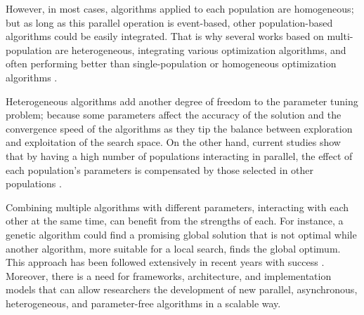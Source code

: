 \documentclass[review]{elsarticle}
\begin{document}
However, in most cases, algorithms applied to each population are 
homogeneous; but as long as this parallel operation is event-based, 
other population-based algorithms could be easily integrated.  That is why several
works based on multi-population are heterogeneous, integrating various
optimization algorithms, and often performing better than single-population or
homogeneous optimization algorithms \cite{wu2016differential,nseef2016adaptive}.

Heterogeneous algorithms add another degree of freedom to the parameter
tuning problem; because some parameters affect 
the accuracy of the solution and the convergence speed of the algorithms as they
tip the balance between exploration and exploitation of the search space. On the 
other hand, current studies show that by having a high number of populations 
interacting in parallel, the effect of each population's parameters is compensated 
by those selected in other populations \cite{li2016multi,tanabe2013evaluation}. %



Combining multiple algorithms with different parameters, interacting with each
other at the same time, can benefit from the strengths of each. For instance, a
genetic algorithm could find a promising global solution that is not optimal
while another algorithm, more suitable for a local search, finds the global
optimum. This approach has been followed extensively in recent years with
success \cite{li2015multi,godio2016multi,biswas2014co}. 
Moreover, there is a need for frameworks, architecture, and
implementation models that can allow researchers the development of new
parallel, asynchronous, heterogeneous, and parameter-free algorithms in a scalable way.  
\end{document}
